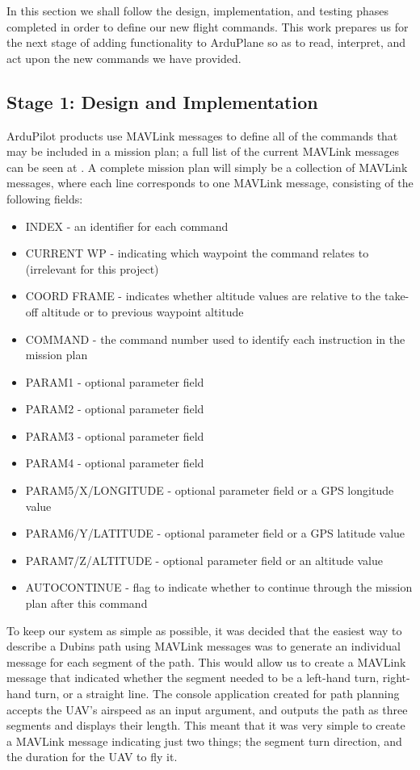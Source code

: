 In this section we shall follow the design, implementation, and testing phases completed in order to define our new flight commands. This work prepares us for the next stage of adding functionality to ArduPlane so as to read, interpret, and act upon the new commands we have provided. 

\subsection{Stage 1: Design and Implementation}
\label{task2:stage1:design}

ArduPilot products use MAVLink messages to define all of the commands that may be included in a mission plan; a full list of the current MAVLink messages can be seen at \cite{MavlinkMessages}. A complete mission plan will simply be a collection of MAVLink messages, where each line corresponds to one MAVLink message, consisting of the following fields:

\begin{itemize}
	\item INDEX - an identifier for each command
	\item CURRENT WP - indicating which waypoint the command relates to (irrelevant for this project)
	\item COORD FRAME - indicates whether altitude values are relative to the take-off altitude or to previous waypoint altitude
	\item COMMAND - the command number used to identify each instruction in the mission plan
	\item PARAM1 - optional parameter field
	\item PARAM2 - optional parameter field
	\item PARAM3 - optional parameter field
	\item PARAM4 - optional parameter field
	\item PARAM5/X/LONGITUDE - optional parameter field or a GPS longitude value 
	\item PARAM6/Y/LATITUDE - optional parameter field or a GPS latitude value
	\item PARAM7/Z/ALTITUDE - optional parameter field or an altitude value
	\item AUTOCONTINUE - flag to indicate whether to continue through the mission plan after this command
\end{itemize}

 To keep our system as simple as possible, it was decided that the easiest way to describe a Dubins path using MAVLink messages was to generate an individual message for each segment of the path. This would allow us to create a MAVLink message that indicated whether the segment needed to be a left-hand turn, right-hand turn, or a straight line. The console application created for path planning accepts the UAV's airspeed as an input argument, and outputs the path as three segments and displays their length. This meant that it was very simple to create a MAVLink message indicating just two things; the segment turn direction, and the duration for the UAV to fly it. 

